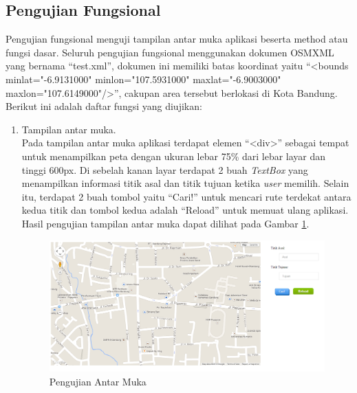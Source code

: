 \subsection{Pengujian Fungsional}
Pengujian fungsional menguji tampilan antar muka aplikasi beserta method atau
fungsi dasar. Seluruh pengujian fungsional menggunakan dokumen OSMXML
yang bernama ``test.xml'', dokumen ini memiliki batas koordinat yaitu ``<bounds
minlat="-6.9131000" minlon="107.5931000" maxlat="-6.9003000"
maxlon="107.6149000"/>'', cakupan area tersebut berlokasi di Kota Bandung.
Berikut ini adalah daftar fungsi yang diujikan:
\begin{enumerate}
  \item Tampilan antar muka.\\
  Pada tampilan antar muka aplikasi terdapat elemen ``<div>'' sebagai tempat
  untuk menampilkan peta dengan ukuran lebar 75\% dari lebar layar dan tinggi 600px. 
  Di sebelah kanan layar terdapat 2 buah \textit{TextBox} yang menampilkan informasi titik asal
  dan titik tujuan ketika \textit{user} memilih. Selain itu, terdapat 2 buah
  tombol yaitu ``Cari!'' untuk mencari rute terdekat antara kedua titik
  dan tombol kedua adalah ``Reload'' untuk memuat ulang aplikasi. Hasil
  pengujian tampilan antar muka dapat dilihat pada Gambar \ref{fig:pu_antarmuka}.
\begin{figure}[h]
\centering
\includegraphics[scale=0.45]{Gambar/pu_antarmuka}
\caption[Pengujian Antar Muka]{Pengujian Antar Muka}
\label{fig:pu_antarmuka}
\end{figure}
  

\end{enumerate}

